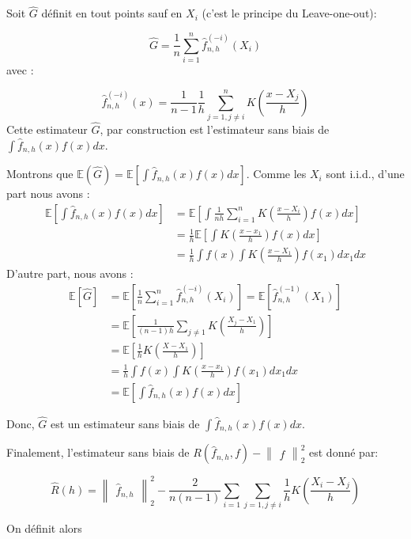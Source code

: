 \documentclass[
]{book}
\begin{document}
\begin{lem} Soit $\hat {G}$ définit en tout points sauf en $X_i$ (c'est le principe du Leave-one-out):

$$
\hat{G} = \frac{1}{n}\sum_{i=1}^n\hat {f}_{n,h}^{(-i)}(X_i)
$$
avec :

$$
  \hat {f}_{n,h}^{(-i)}(x)= \frac{1}{n-1}\frac{1}{h}\sum_{j=1,j\ne i}^nK(\frac{x-X_j}{h})
$$
Cette estimateur $\hat G$, par construction est l'estimateur sans biais de $\int \hat{f}_{n,h}(x)f(x)dx$.
\end{lem}
\begin{demo}
Montrons que $\mathbb{E}(\hat{G})=\mathbb{E}[\int \hat{f}_{n,h}(x)f(x)dx]$.\newline
Comme les $X_i$ sont i.i.d., d'une part nous avons :
$$
\begin{aligned}
\mathbb{E}[\int \hat {f}_{n,h}(x)f(x)dx]&= \mathbb{E}[\int \frac {1}{nh}\sum_{i=1}^nK(\frac {x-X_i}{h})f(x)dx]\\
&=\frac{1}{h}\mathbb{E}[\int K(\frac {x-x_1}{h})f(x)dx] \\
&=\frac{1}{h}\int f(x)\int K(\frac {x-X_1}{h})f(x_1)dx_1dx
\end{aligned}
$$
D'autre part, nous avons : 
$$ 
\begin{aligned}
\mathbb{E}[\hat{G}]&=\mathbb{E}[\frac{1}{n}\sum_{i=1}^n\hat{f}_{n,h}^{(-i)}(X_i)]
=\mathbb{E}[\hat{f}_{n,h}^{(-1)}(X_1)]\\
&=\mathbb{E}[\frac{1}{(n-1)h}\sum_{j\ne 1}K(\frac{X_j-X_1}{h})]\\
&=\mathbb{E}[\frac{1}{h}K(\frac{X-X_1}{h})]\\
&=\frac{1}{h}\int f(x)\int K(\frac{x-x_1}{h})f(x_1)dx_1dx\\
&=\mathbb{E}[\int \hat{f}_{n,h}(x)f(x)dx] 
\end{aligned}
$$

Donc, $\hat{G}$ est un estimateur sans biais de $\int\hat{f}_{n,h}(x)f(x)dx$.
\end{demo}

Finalement, l'estimateur sans biais de \(R(\hat{f}_{n,h}, f)-\begin{Vmatrix}{f}\end{Vmatrix}_2^2\) est donné par:

\[
\hat{R}(h)=\begin{Vmatrix}\hat{f}_{n,h}\end{Vmatrix}_2^2-\frac{2}{n(n-1)}\sum_{i=1}\sum_{j=1,j\ne i}\frac{1}{h}K(\frac{X_i-X_j}{h})
\]

On définit alors
\end{document}
